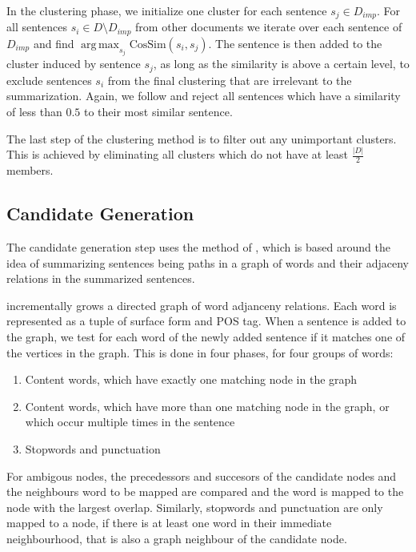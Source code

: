 \documentclass[a4paper,BCOR=10mm]{report}
\DeclareMathOperator*{\argmax}{arg\,max}
\begin{document}
In the clustering phase, we initialize one cluster for each sentence $s_j \in D_{imp}$. For all sentences $s_i \in D \setminus D_{imp}$ from other documents we iterate over each sentence of $D_{imp}$ and find $\argmax_{s_j} \text{CosSim}(s_i, s_j)$. The sentence is then added to the cluster induced by sentence $s_j$, as long as the similarity is above a certain level, to exclude sentences $s_i$ from the final clustering that are irrelevant to the summarization.
Again, we follow \citeauthor{banerjee} and reject all sentences which have a similarity of less than $0.5$ to their most similar sentence.

The last step of the clustering method is to filter out any unimportant clusters. This is achieved by eliminating all clusters which do not have at least $\frac{|D|}{2}$ members.


\subsection{Candidate Generation} \label{sec:baseline-generation}

The candidate generation step uses the method of \citet{fillipova}, which is based around the idea of summarizing sentences being paths in a graph of words and their adjaceny relations in the summarized sentences.

\citeauthor{fillipova} incrementally grows a directed graph of word adjanceny relations. Each word is represented as a tuple of surface form and POS tag. When a sentence is added to the graph, we test for each word of the newly added sentence if it matches one of the vertices in the graph. This is done in four phases, for four groups of words:

\begin{enumerate}
\item{Content words, which have exactly one matching node in the graph}
\item{Content words, which have more than one matching node in the graph, or which occur multiple times in the sentence}
\item{Stopwords and punctuation} %
\end{enumerate}

For ambigous nodes, the precedessors and succesors of the candidate nodes and the neighbours word to be mapped are compared and the word is mapped to the node with the largest overlap.
Similarly, stopwords and punctuation are only mapped to a node, if there is at least one word in their immediate neighbourhood, that is also a graph neighbour of the candidate node.
\end{document}
